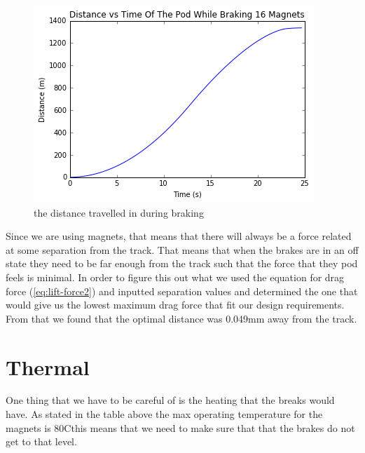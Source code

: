 \documentclass[main.tex]{subfiles}
\begin{document}
    \begin{figure}[H]
        \centering
        \includegraphics[width=\linewidth]{images/totaldistanceprofile}
        \caption{the distance travelled in during braking}
        \label{fig:distance-profile}
    \end{figure}
    
    Since we are using magnets, that means that there will always be a force related at some separation from the track. That means that when the brakes are in an off state they need to be far enough from the track such that the force that they pod feels is minimal. In order to figure this out what we used the equation for drag force (\ref{eq:lift-force2}) and inputted separation values and determined the one that would give us the lowest maximum drag force that fit our design requirements. From that we found that the optimal distance was 0.049mm away from the track.    
    
    \section{Thermal}
    One thing that we have to be careful of is the heating that the breaks would have. As stated in the table above the max operating temperature for the magnets is $80$C\textdegree this means that we need to make sure that that the brakes do not get to that level.\\
\end{document}
